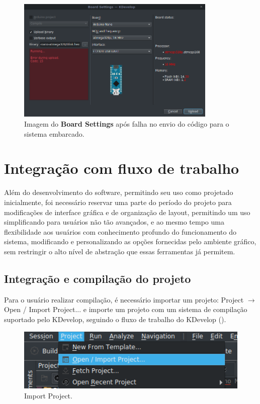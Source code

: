 \begin{figure}[!htb]
  \centering
  \includegraphics[width=0.85\textwidth]{figuras/boardsettingsndone.png}
  \caption[Board Settings com falha no envio]{Imagem do \textbf{Board Settings} após falha no envio do código para o sistema embarcado.}
  \label{fig:boardsettingsndone}
\end{figure}

\section{Integração com fluxo de trabalho}
Além do desenvolvimento do software, permitindo seu uso como projetado inicialmente, foi necessário reservar uma parte do período do projeto para modificações de interface gráfica e de organização de layout, permitindo um uso simplificando para usuários não tão avançados, e ao mesmo tempo uma flexibilidade aos usuários com conhecimento profundo do funcionamento do sistema, modificando e personalizando as opções fornecidas pelo ambiente gráfico, sem restringir o alto nível de abstração que essas ferramentas já permitem.

\subsection{Integração e compilação do projeto}

Para o usuário realizar compilação, é necessário importar um projeto: Project $\rightarrow$ Open / Import Project... e importe um projeto com um sistema de compilação suportado pelo KDevelop, seguindo o fluxo de trabalho do KDevelop ().

\begin{figure}[!htb]
  \centering
  \includegraphics[width=1\textwidth]{figuras/importproject.png}
  \caption[Import Project]{Import Project.}
  \label{fig:importproject}
\end{figure}

